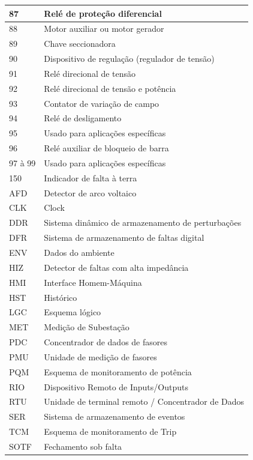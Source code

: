 \documentclass[a5paper,english,spanish,brazil]{ufsc-thesis}
\begin{document}
\begin{longtable}{|l|p{}|}
  87 & Relé de proteção diferencial \\ \hline
  88 & Motor auxiliar ou motor gerador \\ \hline
  89 & Chave seccionadora \\ \hline
  90 & Dispositivo de regulação (regulador de tensão) \\ \hline
  91 & Relé direcional de tensão \\ \hline
  92 & Relé direcional de tensão e potência \\ \hline
  93 & Contator de variação de campo \\ \hline
  94 & Relé de desligamento \\ \hline
  95 & Usado para aplicações específicas  \\ \hline
  96 & Relé auxiliar de bloqueio de barra  \\ \hline
  97 à 99 & Usado para aplicações específicas  \\ \hline
  150 & Indicador de falta à terra  \\ \hline
  AFD & Detector de arco voltaico  \\ \hline
  CLK & Clock  \\ \hline
  DDR & Sistema dinâmico de armazenamento de perturbações  \\ \hline
  DFR & Sistema de armazenamento de faltas digital  \\ \hline
  ENV & Dados do ambiente  \\ \hline
  HIZ & Detector de faltas com alta impedância  \\ \hline
  HMI & Interface Homem-Máquina  \\ \hline
  HST & Histórico  \\ \hline
  LGC & Esquema lógico  \\ \hline
  MET & Medição de Subestação  \\ \hline
  PDC & Concentrador de dados de fasores  \\ \hline
  PMU & Unidade de medição de fasores  \\ \hline
  PQM & Esquema de monitoramento de potência  \\ \hline
  RIO & Dispositivo Remoto de Inputs/Outputs  \\ \hline
  RTU & Unidade de terminal remoto / Concentrador de Dados  \\ \hline
  SER & Sistema de armazenamento de eventos  \\ \hline
  TCM & Esquema de monitoramento de Trip  \\ \hline
  SOTF & Fechamento sob falta  \\ \hline
\end{longtable}
\end{document}
